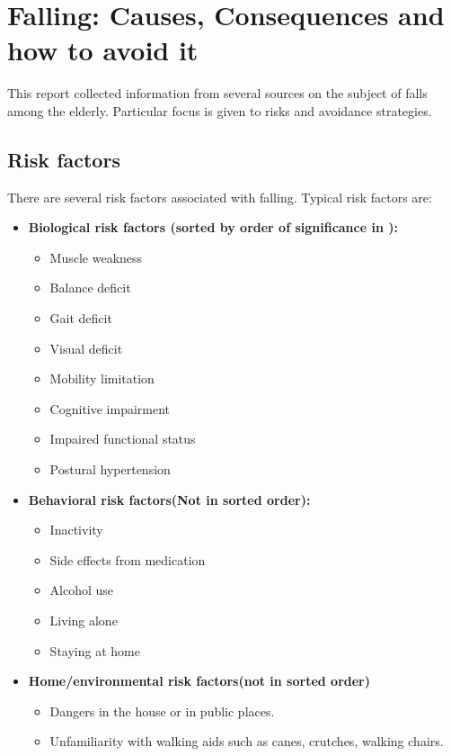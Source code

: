 
\section{Falling: Causes, Consequences and how to avoid it}
This report collected information from several sources on the subject of falls among the elderly. Particular focus is given to risks and avoidance strategies.

\subsection{Risk factors}

There are several risk factors associated with falling. Typical risk factors are:
\begin{itemize}
\item 
\textbf{Biological risk factors (sorted by order of significance in  \cite{fallsRubenstein}):}
\begin{itemize}
\item Muscle weakness
\item Balance deficit
\item Gait deficit
\item Visual deficit
\item Mobility limitation
\item Cognitive impairment
\item Impaired functional status
\item Postural hypertension
\end{itemize}
\item 
\textbf{Behavioral risk factors(Not in sorted order):}
\begin{itemize}
\item Inactivity
\item Side effects from medication
\item Alcohol use
\item Living alone
\item Staying at home
\end{itemize}
\item 
\textbf{Home/environmental risk factors(not in sorted order)}
\begin{itemize}
\item Dangers in the house or in public places.
\item Unfamiliarity with walking aids such as canes, crutches, walking chairs.
\end{itemize}
\end{itemize}


